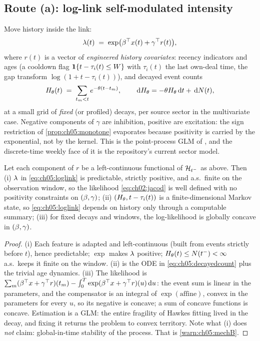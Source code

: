 \subsection*{Route (a): log-link self-modulated intensity}

Move history inside the link:
\begin{equation}\label{eq:ch05:loglink}
\lambda(t) \;=\; \exp\!\big(\beta^\top x(t) + \gamma^\top r(t)\big),
\end{equation}
where $r(t)$ is a vector of \emph{engineered history covariates}:
recency indicators and ages (a cooldown flag $\mathbf{1}\{t - \tau_i(t) \le W\}$
with $\tau_i(t)$ the last own-deal time, the gap transform $\log(1 +
t-\tau_i(t))$), and decayed event counts
\begin{equation}\label{eq:ch05:decayedcount}
H_{\theta}(t) \;=\; \sum_{t_m < t} e^{-\theta (t - t_m)},
\qquad \,\mathrm{d} H_{\theta} = -\theta H_{\theta}\,\mathrm{d} t + \,\mathrm{d} N(t),
\end{equation}
at a small grid of \emph{fixed} (or profiled) decays, per source sector in
the multivariate case. Negative components of $\gamma$ are inhibition,
positive are excitation: the sign restriction of
\cref{prop:ch05:monotone} evaporates because positivity is carried by the
exponential, not by the kernel. This is the point-process GLM of
\citet{truccolo2005}, and the discrete-time weekly face of it is the
repository's current sector model.

\begin{proposition}\label{prop:ch05:loglinkvalid}
Let each component of $r$ be a left-continuous functional of
$\mathcal{H}_{t^-}$ as above. Then (i) $\lambda$ in \cref{eq:ch05:loglink} is
predictable, strictly positive, and a.s.\ finite on the observation
window, so the likelihood \cref{eq:ch02:jacod} is well defined with no
positivity constraints on $(\beta,\gamma)$; (ii) $(H_{\theta}, t -
\tau_i(t))$ is a finite-dimensional Markov state, so \cref{eq:ch05:loglink}
depends on history only through a computable summary; (iii) for fixed
decays and windows, the log-likelihood is globally concave in
$(\beta,\gamma)$.
\end{proposition}

\begin{proof}
(i) Each feature is adapted and left-continuous (built from events
strictly before $t$), hence predictable; $\exp$ makes $\lambda$ positive;
$H_{\theta}(t) \le N(t^-) < \infty$ a.s.\ keeps it finite on the window.
(ii) is the ODE in \cref{eq:ch05:decayedcount} plus the trivial age
dynamics. (iii) The likelihood is $\sum_m (\beta^\top x +
\gamma^\top r)(t_m) - \int_0^{T} \exp(\beta^\top x +
\gamma^\top r)(u)\,\mathrm{d} u$: the event sum is linear in the parameters, and
the compensator is an integral of $\exp(\text{affine})$, convex in the
parameters for every $u$, so its negative is concave; a sum of concave
functions is concave. Estimation is a GLM: the entire fragility of Hawkes
fitting lived in the decay, and fixing it returns the problem to convex
territory. Note what (i) does \emph{not} claim: global-in-time stability
of the process. That is \cref{warn:ch05:mechB}.
\end{proof}

